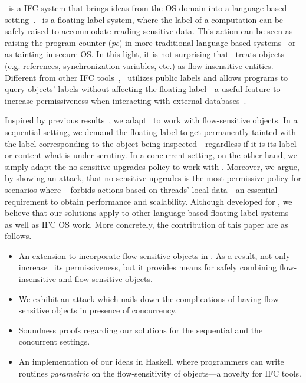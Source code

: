 \LIO~is a IFC system that brings ideas from the OS domain into a language-based
setting~\citep{stefan:lio,stefan:addressing-covert}.  \LIO~is a floating-label
system, where the label of a computation can be safely raised to accommodate
reading sensitive data. This action can be seen as raising the program counter
(\emph{pc}) in more traditional language-based
systems~\citep{sabelfeld:language-based-iflow} or as tainting in secure OS.  In
this light, it is not surprising that \LIO~treats objects (e.g. references,
synchronization variables, etc.) as flow-insensitive entities. Different from
other IFC tools~\citep{jif,FlowCaml,Hedin13}, \LIO~utilizes public labels and
allows programs to query objects' labels without affecting the
floating-label---a useful feature to increase permissiveness when interacting
with external databases~\citep{giffin:hails}.

Inspired by previous results~\citep{Austin:Flanagan:PLAS10}, we adapt \LIO~to
work with flow-sensitive objects. In a sequential setting, we demand the
floating-label to get permanently tainted with the label corresponding to the
object being inspected---regardless if it is its label or content what is under
scrutiny. In a concurrent setting, on the other hand, we simply adapt the
no-sensitive-upgrades policy to work with \LIO. Moreover, we argue, by showing
an attack, that no-sensitive-upgrades is the most permissive policy for
scenarios where \LIO~ forbids actions based on threads' local data---an
essential requirement to obtain performance and scalability. Although developed
for \LIO, we believe that our solutions apply to other language-based
floating-label systems~\citep[e.g.][]{10.1109/SP.2013.10} as well as IFC OS
work.  More concretely, the contribution of this paper are as follows.
\begin{itemize}

\item An extension to incorporate flow-sensitive objects in \LIO. As a result,
  not only increase \LIO~its permissiveness, but it provides means for safely
  combining flow-insensitive and flow-sensitive objects.


\item We exhibit an attack which nails down the complications of having
  flow-sensitive objects in presence of concurrency.

\item Soundness proofs regarding our solutions for the sequential and 
the concurrent settings. 

\item An implementation of our ideas in Haskell, where programmers can write
  routines \emph{parametric} on the flow-sensitivity of objects---a novelty for IFC
  tools. 
\end{itemize}

